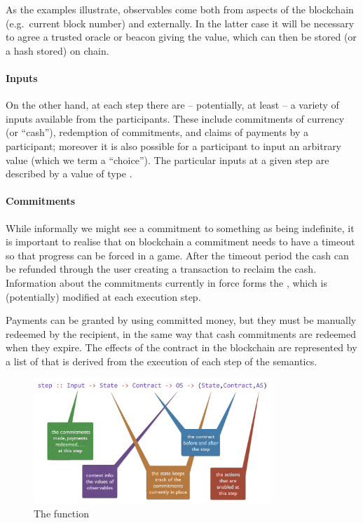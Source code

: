 \documentclass[
      acmsmall
    , screen
    , review=true
  ]{acmart}
\begin{document}
As the examples illustrate, observables come both from aspects of the blockchain (e.g.\ current block number) and externally. In the latter case it will be necessary to agree a trusted oracle or beacon giving the value, which can then be stored (or a hash stored) on chain.

\paragraph{Inputs}


On the other hand, at each step there are -- potentially, at least -- a variety of inputs available from the participants. These include commitments of currency (or ``cash''), redemption of commitments, and claims of payments by a participant; moreover it is also possible for a participant to input an arbitrary value (which we term a ``choice''). The particular inputs at a given step are described by a value of type .

\paragraph{Commitments}


While informally we might see a commitment to something as being indefinite, it is important to realise that on blockchain a commitment needs to have a timeout so that progress can be forced in a game. After the timeout period the cash can be refunded through the user creating a transaction to reclaim the cash.
Information about the commitments currently in force forms the , which is (potentially) modified at each execution step. 

Payments can be granted by using committed money, but they must be manually redeemed by the recipient, in the 
same way that cash commitments are redeemed when they expire. The effects of the contract in the blockchain are 
represented by a list  of  that is derived from the execution of each step of the semantics.

\begin{figure}[t]
\begin{center}
\includegraphics[width=0.8\textwidth]{pix/step-type.png}
\caption{The  function}
\label{fig:step-function}
\end{center}
\end{figure}
\end{document}
